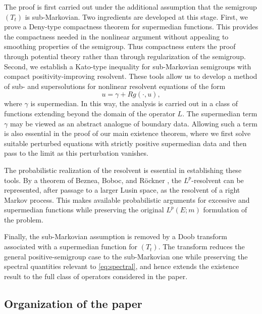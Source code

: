 \documentclass[11pt,a4paper,reqno]{amsart}
\theoremstyle{definition}
\numberwithin{equation}{section}
\begin{document}
The proof is first carried out under the additional assumption that the
semigroup $(T_t)$ is sub-Markovian. Two ingredients are developed at this
stage. 
First, we prove a Deny-type compactness theorem for supermedian
functions. This provides the compactness needed in the nonlinear
argument without appealing to smoothing properties of the semigroup.
Thus compactness enters the proof through potential theory rather
than through regularization of the semigroup.
Second, we establish a Kato-type inequality for
sub-Markovian semigroups with compact positivity-improving resolvent. These
tools allow us to develop a method of sub- and supersolutions for nonlinear
resolvent equations of the form
\begin{equation}\label{eq:abstract-fixed-point}
u=\gamma+Rg(\cdot,u),
\end{equation}
where $\gamma$ is supermedian. In this way, the analysis is carried out in
a class of functions extending beyond the domain of the operator $L$.
The supermedian term $\gamma$ may be viewed as an abstract analogue of
boundary data. Allowing such a term is also essential in the proof of our main existence theorem, 
where we first solve suitable perturbed equations with strictly positive supermedian 
data and then pass to the limit as this perturbation vanishes.



The probabilistic realization of the resolvent is essential in establishing
these tools. By a theorem of Beznea, Boboc, and R\"ockner \cite{BBR}, the
$L^p$-resolvent can be represented, after passage to a larger Lusin space,
as the resolvent of a right Markov process. This makes available
probabilistic arguments for excessive and supermedian functions while
preserving the original $L^p(E;m)$ formulation of the problem.

Finally, the sub-Markovian assumption is removed by a Doob transform
associated with a supermedian function for  $(T_t)$. The transform reduces
the general positive-semigroup case to the sub-Markovian one while preserving
the spectral quantities relevant to \eqref{eq:spectral}, and hence extends
the existence result to the full class of operators considered in the paper.


\subsection{Organization of the paper}
\end{document}
